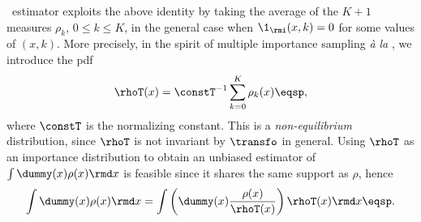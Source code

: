 \IFIS\ estimator exploits the above identity by taking the average of the $K+1$ measures $\rho_k$, $0\leq k \leq K$, in the general case when $\1_{\rmi}(x,k) = 0$ for some values of $(x,k)$. More precisely, in the spirit of multiple importance sampling \emph{\`a la} \cite{owen:zhou:2000}, we introduce the pdf
\begin{equation}\label{eq:rhoT}
    \rhoT(x) =  \constT^{-1}\sum_{k = 0}^K \rho_k(x)\eqsp, %
  \end{equation}
where $\constT$ is the normalizing constant.
This is a \textit{non-equilibrium} distribution, since $\rhoT$ is not invariant by $\transfo$ in general.
Using $\rhoT$ as an importance distribution to obtain an unbiased
  estimator of $\int \dummy(x) \rho(x) \rmd x$ is feasible since it shares the same support as $\rho$, hence
  \[\int \dummy(x) \rho(x)  \rmd x =\int \left(\dummy(x) \frac{\rho(x)}{\rhoT(x)}\right) \rhoT(x)  \rmd x\eqsp.\]


